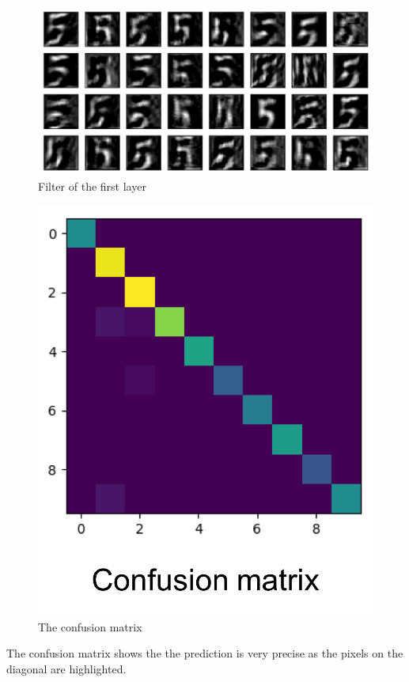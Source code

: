 \documentclass[twocolumn]{webofc}
\begin{document}
\begin{figure}[H]
  \centering
  \includegraphics[width=\columnwidth]{Picturefitlter.png}
  \caption{Filter of the first layer}
\end{figure}


\begin{figure}[H]
  \centering
  \includegraphics[width=0.6\columnwidth]{softmax.png}
  \caption{The confusion matrix}
\end{figure}
The confusion matrix shows the the prediction is very precise as the pixels on the diagonal are highlighted.
\end{document}
